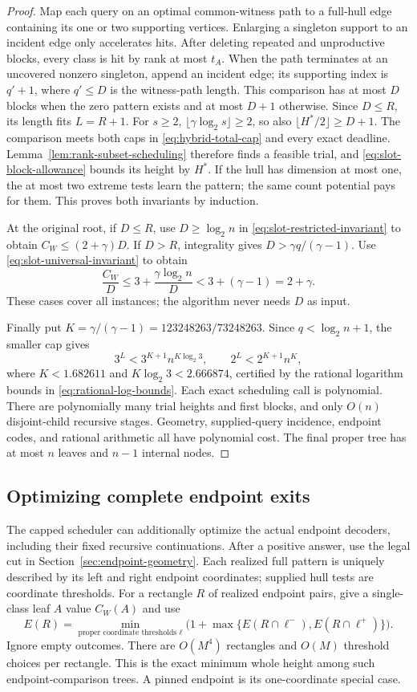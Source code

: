 \begin{proof}
Map each query on an optimal common-witness path to a full-hull
edge containing its one or two supporting vertices. Enlarging a
singleton support to an incident edge only accelerates hits. After
deleting repeated and unproductive blocks, every class is hit by
rank at most $t_A$. When the path terminates at an uncovered nonzero
singleton, append an incident edge; its supporting index is $q'+1$,
where $q'\le D$ is the witness-path length. This comparison has
at most $D$ blocks when the zero pattern exists and at most $D+1$
otherwise. Since $D\le R$, its length fits $L=R+1$.
For $s\ge2$, $\lfloor\gamma\log_2s\rfloor\ge2$, so also
$\lfloor H^*/2\rfloor\ge D+1$. The comparison meets both
caps in \eqref{eq:hybrid-total-cap} and every exact deadline.
Lemma~\ref{lem:rank-subset-scheduling} therefore finds a feasible
trial, and \eqref{eq:slot-block-allowance} bounds its height by $H^*$.
If the hull has dimension at most one, the at most two extreme tests
learn the pattern; the same count potential pays for them. This
proves both invariants by induction.

At the original root, if $D\le R$, use
$D\ge\log_2n$ in \eqref{eq:slot-restricted-invariant} to obtain
$C_W\le(2+\gamma)D$. If $D>R$, integrality gives
$D>\gamma q/(\gamma-1)$. Use
\eqref{eq:slot-universal-invariant} to obtain
\[
 \frac{C_W}{D}\le3+\frac{\gamma\log_2n}{D}
 <3+(\gamma-1)=2+\gamma.
\]
These cases cover all instances; the algorithm never needs $D$ as input.

Finally put $K=\gamma/(\gamma-1)=123248263/73248263$.
Since $q<\log_2n+1$, the smaller cap gives
\[
 3^L<3^{K+1}n^{K\log_2 3},\qquad
 2^L<2^{K+1}n^K,
\]
where $K<1.682611$ and $K\log_2 3<2.666874$, certified by
the rational logarithm bounds in \eqref{eq:rational-log-bounds}.
Each exact scheduling call is polynomial. There are polynomially many
trial heights and first blocks, and only $O(n)$ disjoint-child
recursive stages. Geometry, supplied-query incidence, endpoint codes,
and rational arithmetic all have polynomial cost. The final proper
tree has at most $n$ leaves and $n-1$ internal nodes.
\end{proof}

\subsection{Optimizing complete endpoint exits}

The capped scheduler can additionally optimize the actual endpoint
decoders, including their fixed recursive continuations. After a
positive answer, use the legal cut in
Section~\ref{sec:endpoint-geometry}. Each realized full pattern is
uniquely described by its left and right endpoint coordinates; supplied
hull tests are coordinate thresholds. For a rectangle $R$ of realized
endpoint pairs, give a single-class leaf $A$ value $C_W(A)$ and use
\[
 E(R)=\min_{\text{proper coordinate thresholds }\ell}
       \bigl(1+\max\{E(R\cap\ell^-),E(R\cap\ell^+)\}\bigr).
\]
Ignore empty outcomes. There are $O(M^4)$ rectangles and $O(M)$
threshold choices per rectangle. This is the exact minimum whole
height among such endpoint-comparison trees. A pinned endpoint is
its one-coordinate special case.

